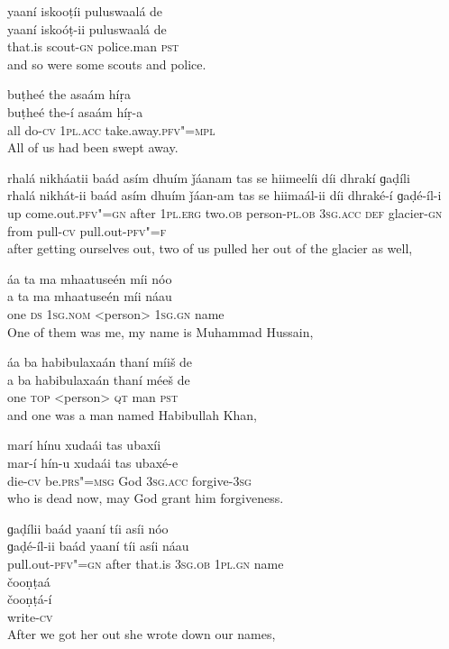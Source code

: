 \begin{exe}
\ex
\label{ex:19}
\glll yaaní	iskooṭíi	puluswaalá	de \\
yaaní	iskoóṭ-ii	puluswaalá	de \\
that.is	scout-\textsc{gn}	police.man \textsc{pst} \\
\glt and so were some scouts and police.

\ex
\label{ex:20}
\glll buṭheé	the	asaám	híṛa \\
buṭheé	the-í	asaám	híṛ-a \\
all	do-\textsc{cv}	\textsc{1pl.acc}	take.away.\textsc{pfv"=mpl} \\
\glt All of us had been swept away.

\ex
\label{ex:21}
\glll rhalá	nikháatii	baád	asím	dhuím	ǰáanam  tas	se	hiimeelíi	díi	dhrakí	ɡaḍíli\\
rhalá	nikhát-ii	baád	asím	dhuím	ǰáan-am tas	se	hiimaál-ii	díi	dhraké-í	ɡaḍé-íl-i\\
up	come.out.\textsc{pfv"=gn}	after	\textsc{1pl.erg}	two.\textsc{ob}	person-\textsc{pl.ob} \textsc{3sg.acc} \textsc{def}	glacier-\textsc{gn}	from	pull-\textsc{cv}	pull.out-\textsc{pfv"=f}\\
\glt after getting ourselves out, two of us pulled her out of the glacier as well,

\ex
\label{ex:22}
\glll áa	ta	ma	mhaatuseén	míi	nóo \\
a	ta	ma	mhaatuseén	míi	náau \\
one	\textsc{ds} \textsc{1sg.nom}	<person> \textsc{1sg.gn}	name \\
\glt One of them was me, my name is Muhammad Hussain,

\ex
\label{ex:23}
\glll áa	ba	habibulaxaán	thaní	míiš	de \\
a	ba	habibulaxaán	thaní	méeš	de \\
one \textsc{top}	<person>	\textsc{qt}	man	\textsc{pst} \\
\glt and one was a man named Habibullah Khan,

\ex
\label{ex:24}
\glll marí	hínu	xudaái	tas	ubaxíi \\
mar-í	hín-u	xudaái	tas	ubaxé-e \\
die-\textsc{cv}	be.\textsc{prs"=msg}	God	\textsc{3sg.acc}	forgive-\textsc{3sg} \\
\glt who is dead now, may God grant him forgiveness.

\ex
\label{ex:25}
\glll ɡaḍílii	baád	yaaní	tíi	asíi	nóo \\
ɡaḍé-íl-ii	baád	yaaní	tíi	asíi	náau \\
pull.out-\textsc{pfv"=gn}	after	that.is	\textsc{3sg.ob}	\textsc{1pl.gn}	name \\
\glll čooṇṭaá \\
čooṇṭá-í \\
write-\textsc{cv} \\
\glt After we got her out she wrote down our names,


\end{exe}
